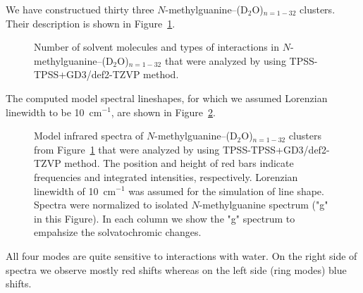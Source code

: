 \documentclass[a4paper,titlepage,twoside,fleqn,12pt]{book}
\begin{document}
We have constructued thirty three $N$-methylguanine--(D$_2$O)$_{n=1-32}$ clusters.
Their description is shown in Figure~\ref{f:guanine-clusters-description}.
%
\begin{figure}[t!]
\centering
\setlength\fboxsep{0.4pt}
\setlength\fboxrule{0.5pt}
\caption{
Number of solvent molecules and 
types of interactions in $N$-methylguanine--(D$_2$O)$_{n=1-32}$ that were analyzed
by using TPSS-TPSS+GD3/def2-TZVP method.
\label{f:guanine-clusters-description}}
\end{figure}
%
The computed model spectral lineshapes, for which we assumed Lorenzian linewidth to be 10~cm$^{-1}$,
are shown in Figure~\ref{f:guanine-clusters-spectra}.
%
\begin{figure}[t!]
\centering
\setlength\fboxsep{0.4pt}
\setlength\fboxrule{0.5pt}
\caption{
Model infrared spectra
of $N$-methylguanine--(D$_2$O)$_{n=1-32}$ clusters from 
Figure~\ref{f:guanine-clusters-description} that were analyzed
by using TPSS-TPSS+GD3/def2-TZVP method. The position and height of red bars
indicate frequencies and integrated intensities, respectively. Lorenzian linewidth of 10~cm$^{-1}$
was assumed for the simulation of line shape. Spectra were normalized to
isolated $N$-methylguanine spectrum ("g" in this Figure). In each column we show
the "g" spectrum to empahsize the solvatochromic changes.
\label{f:guanine-clusters-spectra}}
\end{figure}
%
All four modes are quite sensitive to interactions with water. On the right side
of spectra we observe mostly red shifts whereas on the left side (ring modes)
blue shifts.
\end{document}
